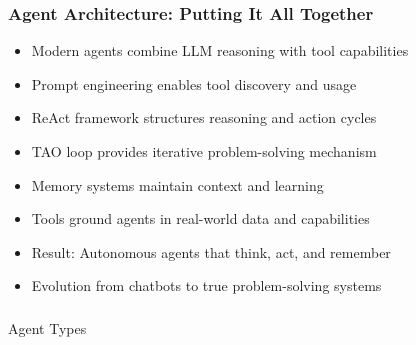 \begin{frame}[fragile]\frametitle{Agent Architecture: Putting It All Together}
      \begin{itemize}
	  \item Modern agents combine LLM reasoning with tool capabilities
	  \item Prompt engineering enables tool discovery and usage
	  \item ReAct framework structures reasoning and action cycles
	  \item TAO loop provides iterative problem-solving mechanism
	  \item Memory systems maintain context and learning
	  \item Tools ground agents in real-world data and capabilities
	  \item Result: Autonomous agents that think, act, and remember
	  \item Evolution from chatbots to true problem-solving systems
	  \end{itemize}
\end{frame}


\begin{frame}[fragile]\frametitle{}
\begin{center}
{\Large Agent Types}
\end{center}
\end{frame}

